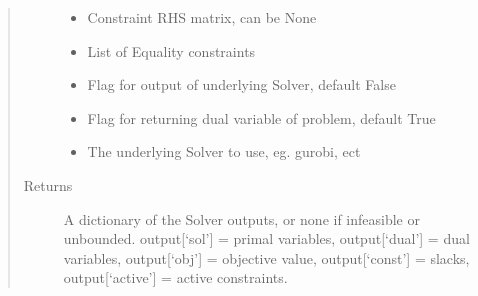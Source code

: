 \documentclass[letterpaper,10pt,english]{sphinxmanual}
\begin{document}
\begin{fulllineitems}
\begin{quote}
\begin{description}
\begin{itemize}
\item {} 
\sphinxAtStartPar
{} \textendash{} Constraint RHS matrix, can be None

\item {} 
\sphinxAtStartPar
{} \textendash{} List of Equality constraints

\item {} 
\sphinxAtStartPar
{} \textendash{} Flag for output of underlying Solver, default False

\item {} 
\sphinxAtStartPar
{} \textendash{} Flag for returning dual variable of problem, default True

\item {} 
\sphinxAtStartPar
{} \textendash{} The underlying Solver to use, eg. gurobi, ect

\end{itemize}

\item[{Returns}] \leavevmode
\sphinxAtStartPar
A dictionary of the Solver outputs, or none if infeasible or unbounded. output{[}‘sol’{]} = primal variables, output{[}‘dual’{]} = dual variables, output{[}‘obj’{]} = objective value, output{[}‘const’{]} = slacks, output{[}‘active’{]} = active constraints.

\end{description}\end{quote}

\end{fulllineitems}

\end{document}
